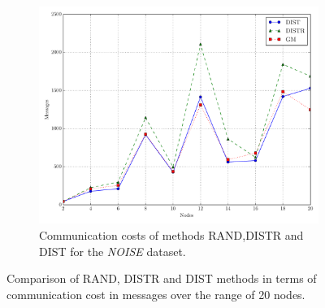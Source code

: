 \begin{figure}[!t]
\begin{subfigure}{0.32\textwidth}%
  \includegraphics[width=\linewidth]{img/matching_msg_noisyinterweaving.pdf}
  \caption{Communication costs of methods RAND,DISTR and DIST for the \emph{NOISE} dataset.}
\end{subfigure}
\vspace{0.5cm}
\caption{Comparison of RAND, DISTR and DIST methods in terms of communication cost in messages over the range of 20 nodes.} \label{fig:matchingComp-msgs}
\end{figure}
